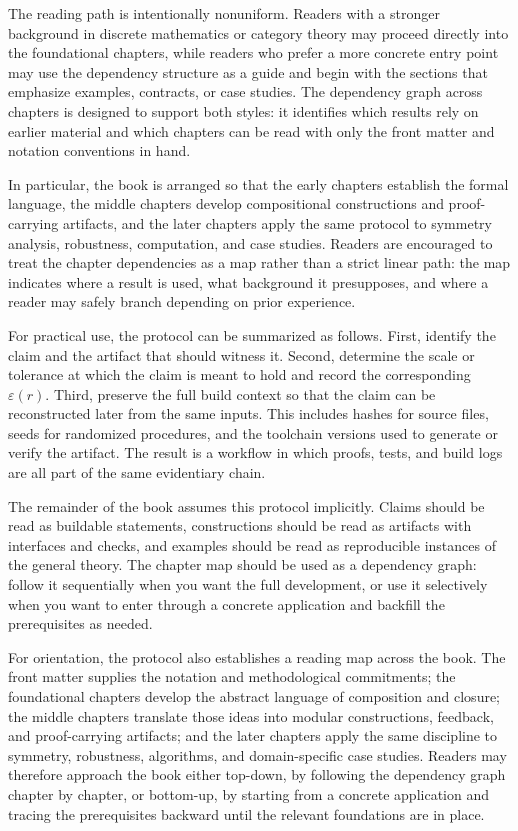 \documentclass[11pt]{article}
\begin{document}
The reading path is intentionally nonuniform. Readers with a stronger background in discrete mathematics or category theory may proceed directly into the foundational chapters, while readers who prefer a more concrete entry point may use the dependency structure as a guide and begin with the sections that emphasize examples, contracts, or case studies. The dependency graph across chapters is designed to support both styles: it identifies which results rely on earlier material and which chapters can be read with only the front matter and notation conventions in hand.

In particular, the book is arranged so that the early chapters establish the formal language, the middle chapters develop compositional constructions and proof-carrying artifacts, and the later chapters apply the same protocol to symmetry analysis, robustness, computation, and case studies. Readers are encouraged to treat the chapter dependencies as a map rather than a strict linear path: the map indicates where a result is used, what background it presupposes, and where a reader may safely branch depending on prior experience.

For practical use, the protocol can be summarized as follows. First, identify the claim and the artifact that should witness it. Second, determine the scale or tolerance at which the claim is meant to hold and record the corresponding \(\varepsilon(r)\). Third, preserve the full build context so that the claim can be reconstructed later from the same inputs. This includes hashes for source files, seeds for randomized procedures, and the toolchain versions used to generate or verify the artifact. The result is a workflow in which proofs, tests, and build logs are all part of the same evidentiary chain.

The remainder of the book assumes this protocol implicitly. Claims should be read as buildable statements, constructions should be read as artifacts with interfaces and checks, and examples should be read as reproducible instances of the general theory. The chapter map should be used as a dependency graph: follow it sequentially when you want the full development, or use it selectively when you want to enter through a concrete application and backfill the prerequisites as needed.

For orientation, the protocol also establishes a reading map across the book. The front matter supplies the notation and methodological commitments; the foundational chapters develop the abstract language of composition and closure; the middle chapters translate those ideas into modular constructions, feedback, and proof-carrying artifacts; and the later chapters apply the same discipline to symmetry, robustness, algorithms, and domain-specific case studies. Readers may therefore approach the book either top-down, by following the dependency graph chapter by chapter, or bottom-up, by starting from a concrete application and tracing the prerequisites backward until the relevant foundations are in place.
\end{document}
